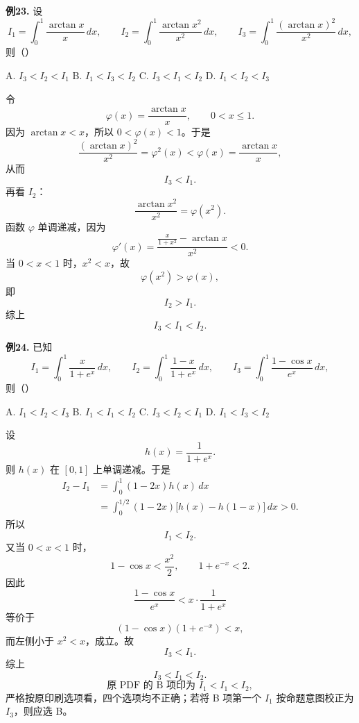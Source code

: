 \begin{problemblock}
\textbf{例23.} 设
\[
I_1=\int_0^1\frac{\arctan x}{x}\,dx,\qquad
I_2=\int_0^1\frac{\arctan x^2}{x^2}\,dx,\qquad
I_3=\int_0^1\frac{(\arctan x)^2}{x^2}\,dx,
\]
则（\quad）

A. \(I_3<I_2<I_1\)\qquad
B. \(I_1<I_3<I_2\)\qquad
C. \(I_3<I_1<I_2\)\qquad
D. \(I_1<I_2<I_3\)
\end{problemblock}
\begin{solutionblock}
令
\[
\varphi(x)=\frac{\arctan x}{x},\qquad 0<x\le1.
\]
因为 \(\arctan x<x\)，所以 \(0<\varphi(x)<1\)。于是
\[
\frac{(\arctan x)^2}{x^2}=\varphi^2(x)<\varphi(x)=\frac{\arctan x}{x},
\]
从而
\[
I_3<I_1.
\]
再看 \(I_2\)：
\[
\frac{\arctan x^2}{x^2}=\varphi(x^2).
\]
函数 \(\varphi\) 单调递减，因为
\[
\varphi'(x)=\frac{\frac{x}{1+x^2}-\arctan x}{x^2}<0.
\]
当 \(0<x<1\) 时，\(x^2<x\)，故
\[
\varphi(x^2)>\varphi(x),
\]
即
\[
I_2>I_1.
\]
综上
\[
I_3<I_1<I_2.
\]
\end{solutionblock}

\begin{problemblock}
\textbf{例24.} 已知
\[
I_1=\int_0^1\frac{x}{1+e^x}\,dx,\qquad
I_2=\int_0^1\frac{1-x}{1+e^x}\,dx,\qquad
I_3=\int_0^1\frac{1-\cos x}{e^x}\,dx,
\]
则（\quad）

A. \(I_1<I_2<I_3\)\qquad
B. \(I_1<I_1<I_2\)\qquad
C. \(I_3<I_2<I_1\)\qquad
D. \(I_1<I_3<I_2\)
\end{problemblock}
\begin{solutionblock}
设
\[
h(x)=\frac1{1+e^x}.
\]
则 \(h(x)\) 在 \([0,1]\) 上单调递减。于是
\[
\begin{aligned}
I_2-I_1
&=\int_0^1(1-2x)h(x)\,dx\\
&=\int_0^{1/2}(1-2x)\bigl[h(x)-h(1-x)\bigr]\,dx>0.
\end{aligned}
\]
所以
\[
I_1<I_2.
\]
又当 \(0<x<1\) 时，
\[
1-\cos x<\frac{x^2}{2},
\qquad 1+e^{-x}<2.
\]
因此
\[
\frac{1-\cos x}{e^x}
<x\cdot\frac1{1+e^x}
\]
等价于
\[
(1-\cos x)(1+e^{-x})<x,
\]
而左侧小于 \(x^2<x\)，成立。故
\[
I_3<I_1.
\]
综上
\[
I_3<I_1<I_2.
\]
\[
\text{原 PDF 的 B 项印为 }I_1<I_1<I_2,
\]
严格按原印刷选项看，四个选项均不正确；若将 B 项第一个 \(I_1\) 按命题意图校正为 \(I_3\)，则应选 B。
\end{solutionblock}

